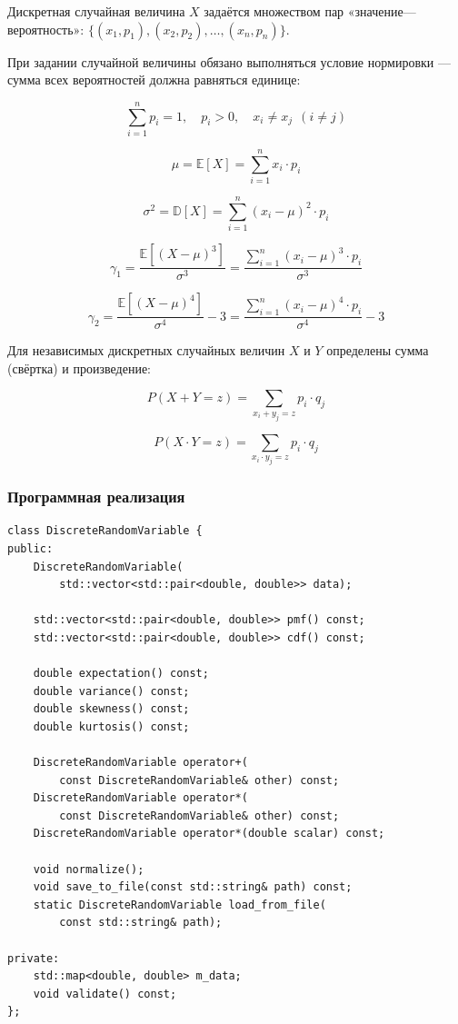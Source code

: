 \documentclass[14pt]{extarticle}
\begin{document}
Дискретная случайная величина \(X\) задаётся множеством пар «значение---вероятность»: \(\{(x_1, p_1), (x_2, p_2), \ldots, (x_n, p_n)\}\).

При задании случайной величины обязано выполняться условие нормировки --- сумма всех вероятностей должна равняться единице:

$$\sum_{i=1}^{n} p_i = 1, \quad p_i > 0, \quad x_i \neq x_j \ \ (i \neq j)$$

$$\mu = \mathbb{E}[X] = \sum_{i=1}^{n} x_i \cdot p_i$$

$$\sigma^2 = \mathbb{D}[X] = \sum_{i=1}^{n} (x_i - \mu)^2 \cdot p_i$$

$$\gamma_1 = \frac{\mathbb{E}[(X - \mu)^3]}{\sigma^3} = \frac{\sum_{i=1}^{n} (x_i - \mu)^3 \cdot p_i}{\sigma^3}$$

$$\gamma_2 = \frac{\mathbb{E}[(X - \mu)^4]}{\sigma^4} - 3 = \frac{\sum_{i=1}^{n} (x_i - \mu)^4 \cdot p_i}{\sigma^4} - 3$$

Для независимых дискретных случайных величин \(X\) и \(Y\) определены сумма (свёртка) и произведение:

$$P(X + Y = z) = \sum_{x_i + y_j = z} p_i \cdot q_j$$

$$P(X \cdot Y = z) = \sum_{x_i \cdot y_j = z} p_i \cdot q_j$$

\clearpage
\subsubsection{Программная реализация}
\label{sec:orgddc4ff5}

\begin{listing}[htbp]
\caption{Интерфейс класса DiscreteRandomVariable}
\begin{verbatim}
class DiscreteRandomVariable {
public:
    DiscreteRandomVariable(
        std::vector<std::pair<double, double>> data);

    std::vector<std::pair<double, double>> pmf() const;
    std::vector<std::pair<double, double>> cdf() const;

    double expectation() const;
    double variance() const;
    double skewness() const;
    double kurtosis() const;

    DiscreteRandomVariable operator+(
        const DiscreteRandomVariable& other) const;
    DiscreteRandomVariable operator*(
        const DiscreteRandomVariable& other) const;
    DiscreteRandomVariable operator*(double scalar) const;

    void normalize();
    void save_to_file(const std::string& path) const;
    static DiscreteRandomVariable load_from_file(
        const std::string& path);

private:
    std::map<double, double> m_data;
    void validate() const;
};
\end{verbatim}
\end{listing}
\end{document}
